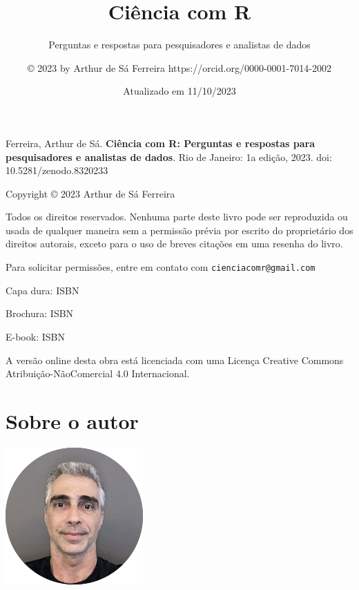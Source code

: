\documentclass[
]{book}
\title{\textbf{Ciência com R}}
\subtitle{Perguntas e respostas para pesquisadores e analistas de dados}
\author{© 2023 by Arthur de Sá Ferreira https://orcid.org/0000-0001-7014-2002}
\date{Atualizado em 11/10/2023}
\renewcommand{\href}[2]{#2\footnote{\url{#1}}}
\newcommand{\DisableFootNotes}{%
  \renewcommand{\footnote}[2][]{\relax}
}
\begin{document}
\maketitle


\newpage


\newpage

{
\setcounter{tocdepth}{1}
\tableofcontents
}
\DisableFootNotes

\mainmatter
\clearpage
\markboth{}{}

Ferreira, Arthur de Sá. \textbf{Ciência com R: Perguntas e respostas para pesquisadores e analistas de dados}. Rio de Janeiro: 1a edição, 2023. \href{https://zenodo.org/badge/latestdoi/685181979}{doi: 10.5281/zenodo.8320233}

\vspace*{\fill}

Copyright © 2023 Arthur de Sá Ferreira

Todos os direitos reservados. Nenhuma parte deste livro pode ser reproduzida ou usada de qualquer maneira sem a permissão prévia por escrito do proprietário dos direitos autorais, exceto para o uso de breves citações em uma resenha do livro.

Para solicitar permissões, entre em contato com \href{mailto:cienciacomr@gmail.com}{\nolinkurl{cienciacomr@gmail.com}}

Capa dura: ISBN

Brochura: ISBN

E-book: ISBN

A versão online desta obra está licenciada com uma Licença Creative Commons Atribuição-NãoComercial 4.0 Internacional.

\hypertarget{sobre-o-autor}{%
\chapter*{Sobre o autor}\label{sobre-o-autor}}

\markboth{}{}

\includegraphics{images/ASF.png}
\end{document}
